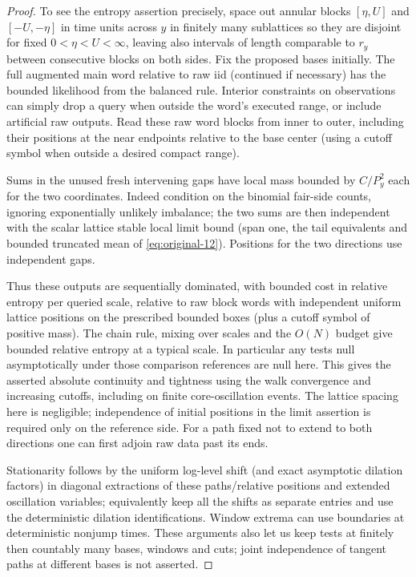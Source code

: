 \begin{proof}

To see the entropy assertion precisely, space out annular blocks \([\eta,U]\) and
\([-U,-\eta]\) in time units across \(y\) in finitely many sublattices so they are
disjoint for fixed \(0<\eta<U<\infty\), leaving also intervals of length comparable to
\(r_y\) between consecutive blocks on both sides. Fix the proposed bases initially. The
full augmented main word relative to raw iid (continued if necessary) has the bounded
likelihood from the balanced rule. Interior constraints on observations can simply drop a
query when outside the word's executed range, or include artificial raw outputs. Read
these raw word blocks from inner to outer, including their positions at the near endpoints
relative to the base center (using a cutoff symbol when outside a desired compact range).


Sums in the unused fresh intervening gaps have local mass bounded by \(C/P_y^2\) each for
the two coordinates. Indeed condition on the binomial fair-side counts, ignoring
exponentially unlikely imbalance; the two sums are then independent with the scalar
lattice stable local limit bound (span one, the tail equivalents and bounded truncated
mean of \eqref{eq:original-12}). Positions for the two directions use independent gaps.


Thus these outputs are sequentially dominated, with bounded cost in relative entropy per
queried scale, relative to raw block words with independent uniform lattice positions on
the prescribed bounded boxes (plus a cutoff symbol of positive mass). The chain rule,
mixing over scales and the \(O(N)\) budget give bounded relative entropy at a typical
scale. In particular any tests null asymptotically under those comparison references are
null here. This gives the asserted absolute continuity and tightness using the walk
convergence and increasing cutoffs, including on finite core-oscillation events. The
lattice spacing here is negligible; independence of initial positions in the limit
assertion is required only on the reference side. For a path fixed not to extend to both
directions one can first adjoin raw data past its ends. 

Stationarity follows by the
uniform log-level shift (and exact asymptotic dilation factors) in diagonal extractions of
these paths/relative positions and extended oscillation variables; equivalently keep all
the shifts as separate entries and use the deterministic dilation identifications. Window
extrema can use boundaries at deterministic nonjump times. These arguments also let us
keep tests at finitely then countably many bases, windows and cuts; joint independence of
tangent paths at different bases is not asserted.

\end{proof}

